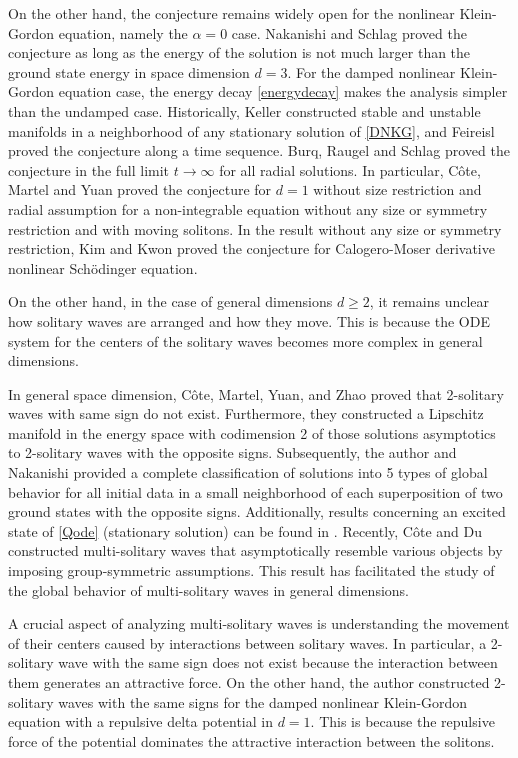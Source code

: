 \documentclass[reqno]{amsart}
\theoremstyle{plain}
\theoremstyle{definition}
\numberwithin{equation}{section}
\newcommand{\1}{\mathbbm{1}}
\begin{document}
On the other hand, the conjecture remains widely open for the nonlinear Klein-Gordon equation, namely the $\alpha=0$ case. Nakanishi and Schlag \cite{NS} proved the conjecture as long as the energy of the solution is not much larger than the ground state energy in space dimension $d=3$. 
For the damped nonlinear Klein-Gordon equation case, the energy decay \eqref{energydecay} makes the analysis simpler than the undamped case. Historically, Keller \cite{K1} constructed stable and unstable manifolds in a neighborhood of any stationary solution of \eqref{DNKG}, and Feireisl \cite{F} proved the conjecture along a time sequence. Burq, Raugel and Schlag \cite{BRS} proved the conjecture in the full limit $t\to\infty$ for all radial solutions. In particular, C\^{o}te, Martel and Yuan \cite{CMY} proved the conjecture for $d=1$ without size restriction and radial assumption for a non-integrable equation without any size or symmetry restriction and with moving solitons. In the result without any size or symmetry restriction, Kim and Kwon \cite{KK} proved the conjecture for Calogero-Moser derivative nonlinear Sch\"{o}dinger equation.

 On the other hand, in the case of general dimensions $d\geq 2$, it remains unclear how solitary waves are arranged and how they move. This is because the ODE system for the centers of the solitary waves becomes more complex in general dimensions. 
 
 In general space dimension, C\^{o}te, Martel, Yuan, and Zhao \cite{CMYZ} proved that 2-solitary waves with same sign do not exist. Furthermore, they constructed a Lipschitz manifold in the energy space with codimension 2 of those solutions asymptotics to 2-solitary waves with the opposite signs. Subsequently, the author and Nakanishi \cite{IN} provided a complete classification of solutions into 5 types of global behavior for all initial data in a small neighborhood of each superposition of two ground states with the opposite signs. Additionally, results concerning an excited state of \eqref{Qode} (stationary solution) can be found in \cite{CY}. Recently, C\^{o}te and Du \cite{CD} constructed multi-solitary waves that asymptotically resemble various objects by imposing group-symmetric assumptions. This result has facilitated the study of the global behavior of multi-solitary waves in general dimensions. 
 
 
A crucial aspect of analyzing multi-solitary waves is understanding the movement of their centers caused by interactions between solitary waves. In particular, a 2-solitary wave with the same sign does not exist because the interaction between them generates an attractive force. On the other hand, the author \cite{I} constructed 2-solitary waves with the same signs for the damped nonlinear Klein-Gordon equation with a repulsive delta potential in $d=1$. This is because the repulsive force of the potential dominates the attractive interaction between the solitons.
\end{document}
